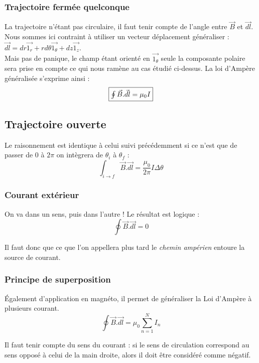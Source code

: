 \documentclass	[11pt, a4paper, openany]{book}
\begin{document}
\subsubsection*{Trajectoire fermée quelconque}
La trajectoire n'étant pas circulaire, il faut tenir compte de l'angle entre $\vec{B}$ et $\vec{dl}$. Nous sommes ici contraint à utiliser un vecteur déplacement généraliser : $\vec{dl} = dr \vec{1_r} + rd\theta \vec{1_\theta} + dz \vec{1_z}$. \\

Mais pas de panique, le champ étant orienté en $\vec{1_\theta}$ seule la composante polaire sera prise en compte ce qui nous ramène au cas étudié ci-dessus. 
La loi d'Ampère généralisée s'exprime ainsi :
\begin{equation}
\fbox{$\oint \vec{B}.\vec{dl} = \mu_0 I$}
\end{equation}


\subsection{Trajectoire ouverte}
Le raisonnement est identique à celui suivi précédemment si ce n'est que de passer de $0$ à $2\pi$ on intègrera de $\theta_i$ à $\theta_f$ :
\begin{equation}
\int_{i\rightarrow f} \vec{B}.\vec{dl} = \frac{\mu_0}{2\pi}I\Delta\theta
\end{equation}


\subsubsection{Courant extérieur}
On va dans un sens, puis dans l'autre ! Le résultat est logique :
\begin{equation}
\oint \vec{B}.\vec{dl} = 0
\end{equation}

Il faut donc que ce que l'on appellera plus tard le \textit{chemin ampérien} entoure la source de courant.

\subsubsection{Principe de superposition}
Également d'application en magnéto, il permet de généraliser la Loi d'Ampère à plusieurs courant.
\begin{equation}
\oint \vec{B}.\vec{dl} = \mu_0 \sum_{n=1}^N I_n
\end{equation}

Il faut tenir compte du sens du courant : si le sens de circulation correspond au sens opposé à celui de la main droite, alors il doit être considéré comme négatif.
\end{document}
